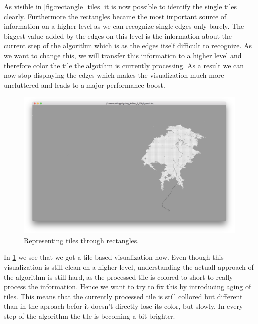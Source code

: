 \documentclass
[
	paper = a4,
    pagesize,
	12 pt,
	oneside,                       %
    open = right,
	DIV = calc,
	BCOR = 0 mm,                   %
	bibtotoc
]
{scrbook}
\begin{document}
As visible in \cref{fig:rectangle_tiles} it is now possible to identify the single tiles clearly.
Furthermore the rectangles became the most important source of information on a higher level as we can recognize single edges only barely.
The biggest value added by the edges on this level is the information about the current step of the algorithm which is as the edges itself difficult to recognize.
As we want to change this, we will transfer this information to a higher level and therefore color the tile the algotihm is currently processing.
As a result we can now stop displaying the edges which makes the visualization much more uncluttered and leads to a major performance boost.

\begin{figure}[H]
	\includegraphics[width=\textwidth]{Images/vis-current-tile.png}
\caption[]{Representing tiles through rectangles.}
\label{fig:color_current_tile}
\end{figure}


In \cref{fig:color_current_tile} we see that we got a tile based visualization now.
Even though this visualization is still clean on a higher level, understanding the actuall approach of the algorithm is still hard, as the processed tile is colored to short to really process the information.
Hence we want to try to fix this by introducing aging of tiles.
This means that the currently processed tile is still collored but different than in the aproach befor it doesn't directly lose its color, but slowly.
In every step of the algorithm the tile is becoming a bit brighter.
\end{document}
